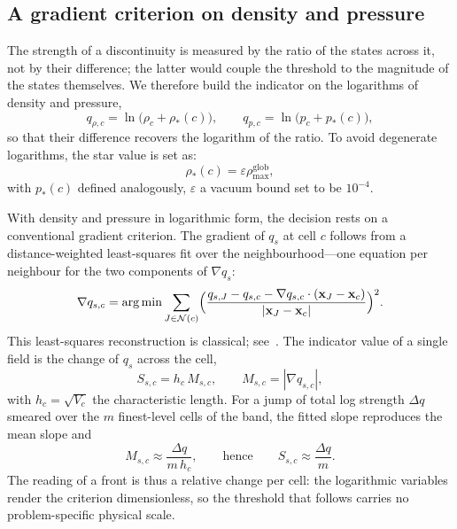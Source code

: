 \documentclass[a4paper]{cas-sc}
\begin{document}
\subsection{A gradient criterion on density and pressure}
\label{sec:indicator_thermo}

The strength of a discontinuity is measured by the ratio of the states across it, not by their difference; the latter would couple the threshold to the magnitude of the states themselves. We therefore build the indicator on the logarithms of density and pressure,
\begin{equation}
	q_{\rho,c}=\ln\bigl(\rho_c+\rho_*(c)\bigr),\qquad
	q_{p,c}=\ln\bigl(p_c+p_*(c)\bigr),
	\label{eq:logvars}
\end{equation}
so that their difference recovers the logarithm of the ratio. To avoid degenerate logarithms, the star value is set as:
\begin{equation}
	\rho_*(c)=\varepsilon\rho_{\max}^{\mathrm{glob}},
	\label{eq:regularisation}
\end{equation}
with \(p_*(c)\) defined analogously, \(\varepsilon\) a vacuum bound set to be \(10^{-4}\).

With density and pressure in logarithmic form, the decision rests on a conventional gradient criterion. The gradient of \(q_s\) at cell \(c\) follows from a distance-weighted least-squares fit over the neighbourhood---one equation per neighbour for the two components of \(\nabla q_s\):
\begin{equation}
	\nabla q_{s,c}=\arg\min\sum_{J\in\mathcal{N}(c)}
	\Bigl(\frac{q_{s,J}-q_{s,c}-\nabla q_{s,c}\cdot
		\left(\mathbf{x}_J-\mathbf{x}_c\right)}
	{|\mathbf{x}_J-\mathbf{x}_c|}\Bigr)^{2}.
	\label{eq:lsq}
\end{equation}
This least-squares reconstruction is classical; see~\cite{maire2009high}. The indicator value of a single field is the change of \(q_s\) across the cell,
\begin{equation}
	S_{s,c}=h_c\,M_{s,c},\qquad M_{s,c}=|\nabla q_{s,c}|,
	\label{eq:scdef}
\end{equation}
with \(h_c=\sqrt{V_c}\) the characteristic length. For a jump of total log strength \(\Delta q\) smeared over the \(m\) finest-level cells of the band, the fitted slope reproduces the mean slope and
\begin{equation}
	M_{s,c} \approx \frac{\Delta q}{m\,h_c},
	\qquad\text{hence}\qquad
	S_{s,c} \approx \frac{\Delta q}{m}.
	\label{eq:scappro}
\end{equation}
The reading of a front is thus a relative change per cell: the logarithmic variables render the criterion dimensionless, so the threshold that follows carries no problem-specific physical scale.
\end{document}
